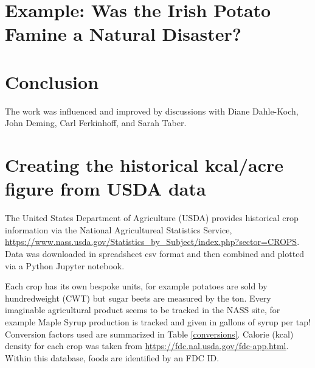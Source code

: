 \documentclass[12pt]{iopart}
\begin{document}
\section{Example: Was the Irish Potato Famine a Natural Disaster?}

\section{Conclusion}


\ack
The work was influenced and improved by discussions with 
Diane Dahle-Koch, 
John Deming, Carl Ferkinhoff, and Sarah Taber.

\clearpage
\appendix
\section{Creating the historical kcal/acre figure from USDA data}
\label{how_yield_plot_is_made}
The United States Department of Agriculture (USDA) provides historical crop information via the National Agricultureal Statistics Service, \url{https://www.nass.usda.gov/Statistics_by_Subject/index.php?sector=CROPS}.  Data was downloaded in spreadsheet csv format and then combined and plotted via a Python Jupyter notebook.   

Each crop has its own bespoke units, for example potatoes are sold by hundredweight (CWT) but sugar beets are measured by the ton.  
Every imaginable agricultural product seems to be tracked in the NASS site, for example Maple Syrup production is tracked and given in gallons of syrup per tap! 
Conversion factors used are summarized in Table \ref{conversions}.  
Calorie (kcal) density for each crop was taken from \url{https://fdc.nal.usda.gov/fdc-app.html}.  Within this database, foods are identified by an FDC ID.  
\end{document}
